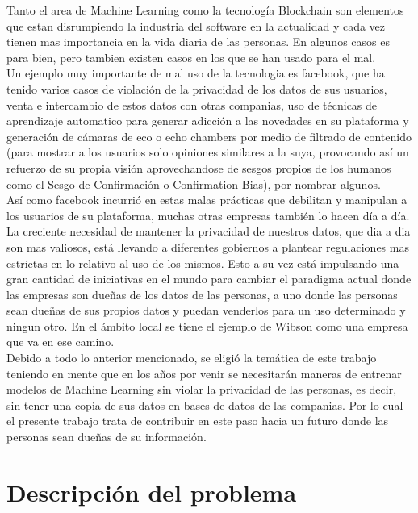 \documentclass[
11pt, %
spanish, %
singlespacing, %
headsepline, %
]{MastersDoctoralThesis} %
\begin{document}
Tanto el area de Machine Learning como la tecnología Blockchain son elementos que estan disrumpiendo la industria del software en la actualidad y cada vez tienen mas importancia en la vida diaria de las personas. En algunos casos es para bien, pero tambien existen casos en los que se han usado para el mal. \\

Un ejemplo muy importante de mal uso de la tecnologia es facebook, que ha tenido varios casos de violación de la privacidad de los datos de sus usuarios, venta e intercambio de estos datos con otras companias, uso de técnicas de aprendizaje automatico para generar adicción a las novedades en su plataforma y generación de cámaras de eco o echo chambers por medio de filtrado de contenido (para mostrar a los usuarios solo opiniones similares a la suya, provocando así un refuerzo de su propia visión aprovechandose de sesgos propios de los humanos como el Sesgo de Confirmación o Confirmation Bias), por nombrar algunos. \\

Así como facebook incurrió en estas malas prácticas que debilitan y manipulan a los usuarios de su plataforma, muchas otras empresas también lo hacen día a día. \\

La creciente necesidad de mantener la privacidad de nuestros datos, que dia a dia son mas valiosos, está llevando a diferentes gobiernos a plantear regulaciones mas estrictas en lo relativo al uso de los mismos.
Esto a su vez está impulsando una gran cantidad de iniciativas en el mundo para cambiar el paradigma actual donde las empresas son dueñas de los datos de las personas, a uno donde las personas sean dueñas de sus propios datos y puedan venderlos para un uso determinado y ningun otro. En el ámbito local se tiene el ejemplo de Wibson como una empresa que va en ese camino. \\

Debido a todo lo anterior mencionado, se eligió la temática de este trabajo teniendo en mente que en los años por venir se necesitarán maneras de entrenar modelos de Machine Learning sin violar la privacidad de las personas, es decir, sin tener una copia de sus datos en bases de datos de las companias. Por lo cual el presente trabajo trata de contribuir en este paso hacia un futuro donde las personas sean dueñas de su información. 


\chapter{Descripci\'on del problema}
\end{document}
